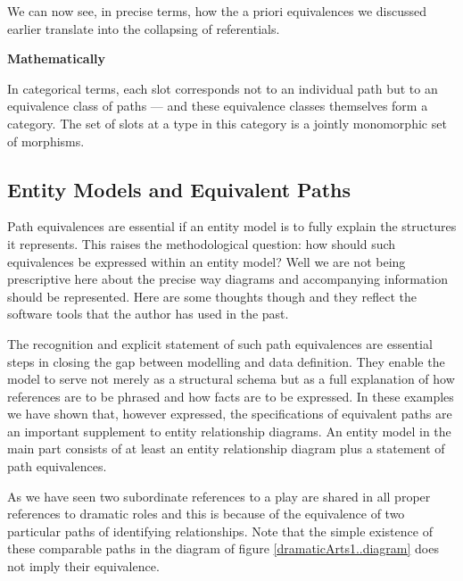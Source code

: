 We can now see, in precise terms, how the a priori equivalences we discussed earlier translate into the collapsing of referentials.

\textbf{Mathematically} 

In categorical terms, each slot corresponds not to an individual path but to an equivalence class of paths — and these equivalence classes themselves form a category. The set of slots at a type in this category is a jointly monomorphic set of morphisms.

\subsection{Entity Models and Equivalent Paths}
\begin{worktt}
Path equivalences are essential if an entity model is to fully explain the structures it represents. 
This raises the methodological question: how should such equivalences be expressed within an entity model? 
Well we are not being prescriptive here about the precise way diagrams and accompanying information should be represented. Here are some thoughts though and they reflect the software tools that the author has used in the past.
\end{worktt} 
\mynote {}
The recognition and explicit statement of such path equivalences are essential steps in closing the gap between modelling and data definition. They enable the model to serve not merely as a structural schema but as a full explanation of how references are to be phrased and how facts are to be expressed.
\mynote
In these examples we have shown that, however expressed,  the specifications of equivalent paths are
an important supplement to entity relationship diagrams. 
An entity model in the main part consists of at least an entity relationship diagram  
plus a statement of path equivalences.


As we have seen two subordinate references to a play are shared in all proper references to dramatic roles 
and this is because of
the equivalence of two particular paths of identifying relationships. 
Note that the simple existence of these comparable paths in the diagram of figure \ref{dramaticArts1..diagram}
does not imply their equivalence.

